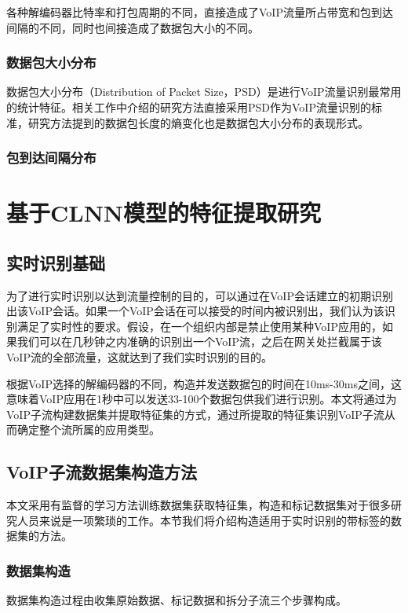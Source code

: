 各种解编码器比特率和打包周期的不同，直接造成了VoIP流量所占带宽和包到达间隔的不同，同时也间接造成了数据包大小的不同。

\subsubsection{数据包大小分布}
数据包大小分布（Distribution of Packet Size，PSD）是进行VoIP流量识别最常用的统计特征。相关工作中介绍的研究方法\supercite{22}直接采用PSD作为VoIP流量识别的标准，研究方法\supercite{4}提到的数据包长度的熵变化也是数据包大小分布的表现形式。




\subsubsection{包到达间隔分布}




\section{基于CLNN模型的特征提取研究}
\subsection{实时识别基础}
为了进行实时识别以达到流量控制的目的，可以通过在VoIP会话建立的初期识别出该VoIP会话。如果一个VoIP会话在可以接受的时间内被识别出，我们认为该识别满足了实时性的要求。假设，在一个组织内部是禁止使用某种VoIP应用的，如果我们可以在几秒钟之内准确的识别出一个VoIP流，之后在网关处拦截属于该VoIP流的全部流量，这就达到了我们实时识别的目的。

根据VoIP选择的解编码器的不同，构造并发送数据包的时间在10ms-30ms之间，这意味着VoIP应用在1秒中可以发送33-100个数据包供我们进行识别。本文将通过为VoIP子流构建数据集并提取特征集的方式，通过所提取的特征集识别VoIP子流从而确定整个流所属的应用类型。

\subsection{VoIP子流数据集构造方法}
本文采用有监督的学习方法训练数据集获取特征集，构造和标记数据集对于很多研究人员来说是一项繁琐的工作。本节我们将介绍构造适用于实时识别的带标签的数据集的方法。
\subsubsection{数据集构造}
\label{sec:construct}
数据集构造过程由收集原始数据、标记数据和拆分子流三个步骤构成。

